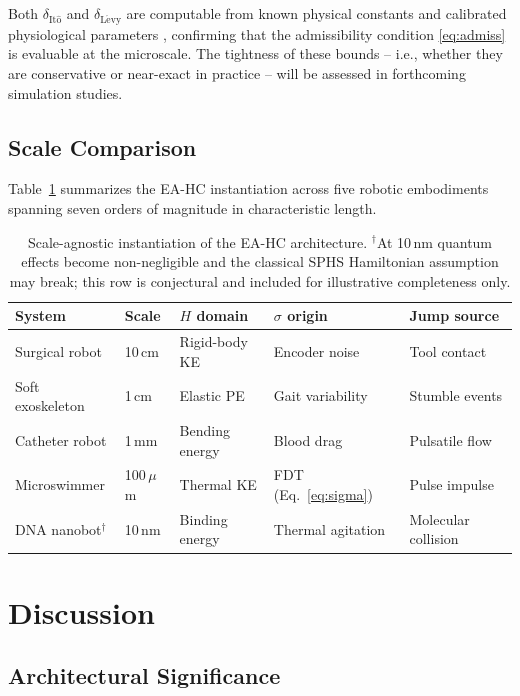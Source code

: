 \documentclass[11pt]{article}
\begin{document}
Both $\delta_{\mathrm{It\hat{o}}}$ and $\delta_{\mathrm{L\acute{e}vy}}$ are computable from
known physical constants and calibrated physiological parameters \cite{ku1997}, confirming
that the admissibility condition \eqref{eq:admiss} is evaluable at the microscale. The
tightness of these bounds -- i.e., whether they are conservative or near-exact in practice --
will be assessed in forthcoming simulation studies.

\subsection{Scale Comparison}

Table~\ref{tab:scale} summarizes the EA-HC instantiation across five robotic embodiments
spanning seven orders of magnitude in characteristic length.

\begin{table}[t]
\centering
\caption{Scale-agnostic instantiation of the EA-HC architecture.
$^\dagger$At 10\,nm quantum effects become non-negligible and the classical SPHS Hamiltonian
assumption may break; this row is conjectural and included for illustrative completeness only.}
\label{tab:scale}
\begin{tabular}{lllll}
\toprule
System & Scale & $H$ domain & $\sigma$ origin & Jump source\\
\midrule
Surgical robot    & 10\,cm & Rigid-body KE & Encoder noise    & Tool contact\\
Soft exoskeleton  & 1\,cm  & Elastic PE    & Gait variability & Stumble events\\
Catheter robot    & 1\,mm  & Bending energy& Blood drag       & Pulsatile flow\\
Microswimmer      & 100\,$\mu$m & Thermal KE & FDT (Eq.~\ref{eq:sigma}) & Pulse impulse\\
DNA nanobot$^\dagger$ & 10\,nm & Binding energy & Thermal agitation & Molecular collision\\
\bottomrule
\end{tabular}
\end{table}

\section{Discussion}
\label{sec:discussion}

\subsection{Architectural Significance}
\end{document}
